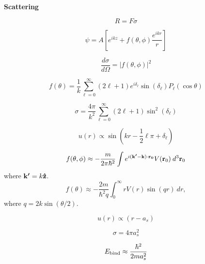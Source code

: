 {\bf Scattering}

\begin{equation}
R = F \sigma
\end{equation}

\begin{equation}
\psi = A \left [
         e^{ikz} + f(\theta,\phi) \frac{e^{ikr}}{r}
         \right ]
\end{equation}

\begin{equation}
\frac{d \sigma}{d \Omega} = |f(\theta,\phi)|^2
\end{equation}

\begin{equation}
f(\theta) = \frac{1}{k} \sum_{\ell=0}^{\infty}
            (2\ell+1) e^{i\delta_{\ell}} \sin(\delta_{\ell})
            P_{\ell}(\cos \theta)
\end{equation}

\begin{equation}
\sigma = \frac{4\pi}{k^2} \sum_{\ell = 0}^{\infty} (2\ell+1)
         \sin ^2(\delta_{\ell})
\end{equation}

\begin{equation}
u(r) \propto \sin \left( kr - \frac{1}{2}\ell\pi+\delta_{\ell}
                  \right)
\end{equation}

\begin{equation}
f(\theta,\phi) \approx - \frac{m}{2\pi\hbar^2}
                 \int e^{i(\boldsymbol{\mathbf{k'}}-\boldsymbol{\mathbf{k}}) \cdot \boldsymbol{\mathbf{r_0}}} V(\boldsymbol{\mathbf{r}}_0)
                      \: d^3 \boldsymbol{\mathbf{r}}_0
\end{equation}
where $\boldsymbol{\mathbf{k'}} = k \boldsymbol{\mathbf{\hat{z}}}$.
\begin{equation}
f(\theta) \approx - \frac{2m}{\hbar^2 q}
          \int_{0}^{\infty} r V(r) \sin(q r) \: dr,
\end{equation}
where $q = 2 k \sin(\theta/2)$.

\begin{equation}
u(r) \propto (r - a_s)
\end{equation}

\begin{equation}
\sigma = 4\pi a_s^2
\end{equation}

\begin{equation}
E_{\rm bind} \approx \frac{\hbar^2}{2ma_s^2}
\end{equation}

